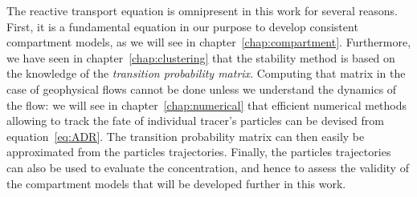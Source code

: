 The reactive transport equation is omnipresent in this work for several reasons. First, it is a fundamental equation in our purpose to develop consistent compartment models, as we will see in chapter~\ref{chap:compartment}. Furthermore, we have seen in chapter~\ref{chap:clustering} that the stability method is based on the knowledge of the \textit{transition probability matrix}. Computing that matrix in the case of geophysical flows cannot be done unless we understand the dynamics of the flow: we will see in chapter~\ref{chap:numerical} that efficient numerical methods allowing to track the fate of individual tracer's particles can be devised from equation~\eqref{eq:ADR}. The transition probability matrix can then easily be approximated from the particles trajectories. Finally, the particles trajectories can also be used to evaluate the concentration, and hence to assess the validity of the compartment models that will be developed further in this work.

